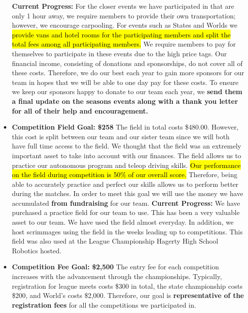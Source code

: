 \begin{itemize}
  \textbf{Current Progress: }
  For the closer events we have participated in that are only 1 hour away, we require members to provide their own transportation; however, we encourage carpooling. For events such as States and Worlds we \hl{provide vans and hotel rooms for the participating members and split the total fees among all participating members.} We require members to pay for themselves to participate in these events due to the high price tags. Our financial income, consisting of donations and sponsorships, do not cover all of these costs. Therefore, we do our best each year to gain more sponsors for our team in hopes that we will be able to one day pay for these costs. To ensure we keep our sponsors happy to donate to our team each year, we \textbf{send them a final update on the seasons events along with a thank you letter for all of their help and encouragement.} 
  \item \textbf{\Large Competition Field Goal: \$258}
  \newline 
   The field in total costs \$480.00. However, this cost is split between our team and our sister team since we will both have full time access to the field. We thought that the field was an extremely important asset to take into account with our finances. The field allows us to practice our autonomous program and teleop driving skills. \hl{Our performance on the field during competition is 50\% of our overall score.} Therefore, being able to accurately practice and perfect our skills allows us to perform better during the matches. In order to meet this goal we will use the money we have accumulated \textbf{from fundraising} for our team.
  \newline 
\textbf{Current Progress:} We have purchased a practice field for our team to use. This has been a very valuable asset to our team. We have used the field almost everyday. In addition, we host scrimmages using the field in the weeks leading up to competitions. This field was also used at the League Championship Hagerty High School Robotics hosted. 
  \item \textbf{\Large Competition Fee Goal: \$2,500}
  \newline 
  The entry fee for each competition increases with the advancement through the championships. Typically, registration for league meets costs \$300 in total, the state championship costs \$200, and World's costs \$2,000. Therefore, our goal is \textbf{representative of the registration fees} for all the competitions we participated in.
  

\end{itemize}
